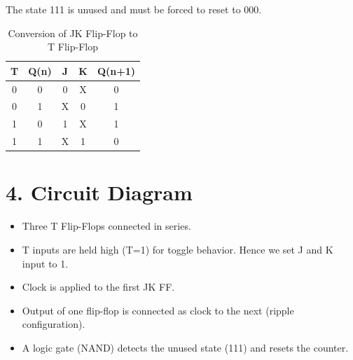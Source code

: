 \documentclass[a4paper,12pt]{article}
\begin{document}
The state 111 is unused and must be forced to reset to 000.

\begin{table}[H]
    \centering
    \renewcommand{\arraystretch}{1.2}
    \begin{tabular}{|c|c|c|c|c|}
        \hline
        T & Q(n) & J & K & Q(n+1)\\ 
        \hline
        0 & 0 & 0 & X & 0\\ 
        0 & 1 & X & 0 & 1\\ 
        1 & 0 & 1 & X & 1\\ 
        1 & 1 & X & 1 & 0\\ 
        \hline
    \end{tabular}
    \caption{Conversion of JK Flip-Flop to T Flip-Flop}
\end{table}

\section*{4. Circuit Diagram}
\begin{itemize}
    \item Three T Flip-Flops connected in series.
    \item T inputs are held high (T=1) for toggle behavior. Hence we set J and K input to 1.  
    \item Clock is applied to the first JK FF.
    \item Output of one flip-flop is connected as clock to the next (ripple configuration).
    \item A logic gate (NAND) detects the unused state (111) and resets the counter.
\end{itemize}
\end{document}
